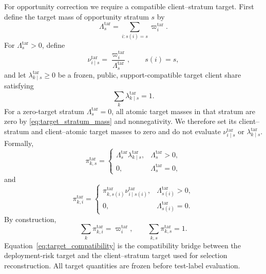 \documentclass[letterpaper,journal]{IEEEtran}
\begin{document}
For opportunity correction we require a compatible client--stratum target.
First define the target mass of opportunity stratum $s$ by
\begin{equation}
    \Lambda_s^{\mathrm{tar}}
    =
    \sum_{i:s(i)=s}\varpi_i^{\mathrm{tar}}.
    \label{eq:target_stratum_mass}
\end{equation}
For $\Lambda_s^{\mathrm{tar}}>0$, define
\begin{equation}
    \nu^{\mathrm{tar}}_{i\mid s}
    =
    \frac{\varpi_i^{\mathrm{tar}}}
         {\Lambda_s^{\mathrm{tar}}},
    \qquad s(i)=s,
    \label{eq:target_conditional_atomic}
\end{equation}
and let $\lambda^{\mathrm{tar}}_{k\mid s}\ge0$ be a frozen, public,
support-compatible target client share satisfying
\begin{equation}
    \sum_k\lambda^{\mathrm{tar}}_{k\mid s}=1.
    \label{eq:target_client_share}
\end{equation}
For a zero-target stratum $\Lambda_s^{\mathrm{tar}}=0$, all atomic target
masses in that stratum are zero by \eqref{eq:target_stratum_mass} and
nonnegativity.  We therefore set its client--stratum and client--atomic target
masses to zero and do not evaluate $\nu^{\mathrm{tar}}_{i\mid s}$ or
$\lambda^{\mathrm{tar}}_{k\mid s}$.  Formally,
\begin{equation}
 \pi^{\mathrm{tar}}_{k,s}
 =
 \begin{cases}
 \Lambda_s^{\mathrm{tar}}\lambda^{\mathrm{tar}}_{k\mid s},
 & \Lambda_s^{\mathrm{tar}}>0,\\
 0, & \Lambda_s^{\mathrm{tar}}=0,
 \end{cases}
 \label{eq:target_ks_mass}
\end{equation}
and
\begin{equation}
 \pi^{\mathrm{tar}}_{k,i}
 =
 \begin{cases}
 \pi^{\mathrm{tar}}_{k,s(i)}
 \nu^{\mathrm{tar}}_{i\mid s(i)},
 & \Lambda_{s(i)}^{\mathrm{tar}}>0,\\
 0, & \Lambda_{s(i)}^{\mathrm{tar}}=0.
 \end{cases}
 \label{eq:target_ki_mass}
\end{equation}
By construction,
\begin{equation}
    \sum_k\pi^{\mathrm{tar}}_{k,i}
    =
    \varpi_i^{\mathrm{tar}},
    \qquad
    \sum_{k,s}\pi^{\mathrm{tar}}_{k,s}=1.
    \label{eq:target_compatibility}
\end{equation}
Equation~\eqref{eq:target_compatibility} is the compatibility bridge between the
deployment-risk target and the client--stratum target used for selection
reconstruction.  All target quantities are frozen before test-label evaluation.
\end{document}
